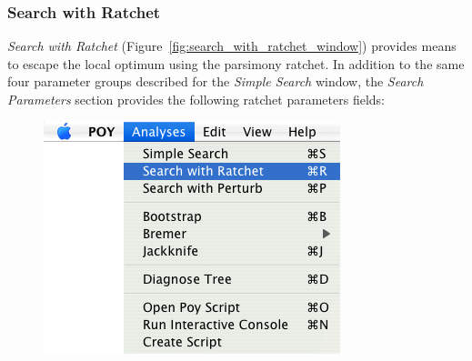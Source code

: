 \subsubsection{Search with Ratchet}

\emph{Search with Ratchet} (Figure~\ref{fig:search_with_ratchet_window}) provides means to escape the local optimum using the parsimony ratchet. In addition to the same four parameter groups described for the \emph{Simple Search} window, the \emph{Search Parameters} section provides the following ratchet parameters fields:

\begin{figure}
\centering
\begin{minipage}[c]{0.48\textwidth}
   		\includegraphics[width=\textwidth]{figures/SearchWithRatchet_Menu.jpg}
\end{minipage}
\quad
\begin{minipage}[c]{0.48\textwidth}

\end{minipage}
\end{figure}
